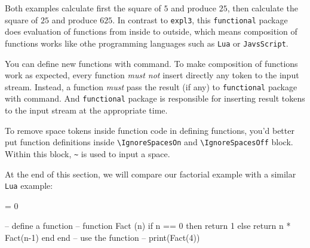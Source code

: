 \documentclass[oneside]{book}
\begin{document}


Both examples calculate first the square of $5$ and produce $25$,
then calculate the square of $25$ and produce $625$.
In contrast to \verb!expl3!, this \verb!functional! package
does evaluation of functions from inside to outside,
which means composition of functions works like othe programming languages
such as \verb!Lua! or \verb!JavsScript!.

You can define new functions with  command.
To make composition of functions work as expected,
every function \emph{must not} insert directly any token to the input stream.
Instead, a function \emph{must} pass the result (if any) to \verb!functional! package
with  command. And \verb!functional! package is responsible for
inserting result tokens to the input stream at the appropriate time.

To remove space tokens inside function code in defining functions,
you'd better put function definitions inside \verb!\IgnoreSpacesOn! and
\verb!\IgnoreSpacesOff! block. Within this block, \verb!~! is used to input a space.

At the end of this section,
we will compare our factorial example with a similar \verb!Lua! example:

\begin{minipage}{0.68\textwidth}
\begin{codehigh}
\IgnoreSpacesOn
\prgNewFunction {} {
   = {0} {
  }{
  }
}
\IgnoreSpacesOff
{}
\end{codehigh}
\end{minipage}%
\begin{minipage}{0.32\textwidth}
\begin{code}
-- define a function --
function Fact (n)
  if n == 0 then
    return 1
  else
    return n * Fact(n-1)
  end
end
-- use the function --
print(Fact(4))
\end{code}
\end{minipage}
\end{document}
